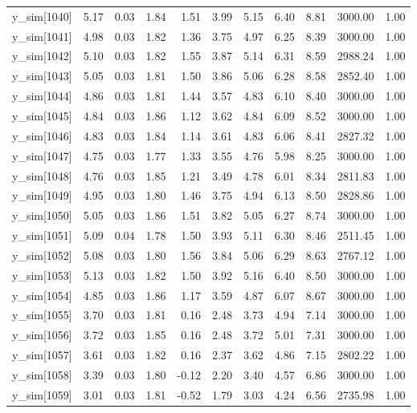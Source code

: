 \begin{table}[ht]
\begin{tabular}{rrrrrrrrrrr}
  y\_sim[1040] & 5.17 & 0.03 & 1.84 & 1.51 & 3.99 & 5.15 & 6.40 & 8.81 & 3000.00 & 1.00 \\ 
  y\_sim[1041] & 4.98 & 0.03 & 1.82 & 1.36 & 3.75 & 4.97 & 6.25 & 8.39 & 3000.00 & 1.00 \\ 
  y\_sim[1042] & 5.10 & 0.03 & 1.82 & 1.55 & 3.87 & 5.14 & 6.31 & 8.59 & 2988.24 & 1.00 \\ 
  y\_sim[1043] & 5.05 & 0.03 & 1.81 & 1.50 & 3.86 & 5.06 & 6.28 & 8.58 & 2852.40 & 1.00 \\ 
  y\_sim[1044] & 4.86 & 0.03 & 1.81 & 1.44 & 3.57 & 4.83 & 6.10 & 8.40 & 3000.00 & 1.00 \\ 
  y\_sim[1045] & 4.84 & 0.03 & 1.86 & 1.12 & 3.62 & 4.84 & 6.09 & 8.52 & 3000.00 & 1.00 \\ 
  y\_sim[1046] & 4.83 & 0.03 & 1.84 & 1.14 & 3.61 & 4.83 & 6.06 & 8.41 & 2827.32 & 1.00 \\ 
  y\_sim[1047] & 4.75 & 0.03 & 1.77 & 1.33 & 3.55 & 4.76 & 5.98 & 8.25 & 3000.00 & 1.00 \\ 
  y\_sim[1048] & 4.76 & 0.03 & 1.85 & 1.21 & 3.49 & 4.78 & 6.01 & 8.34 & 2811.83 & 1.00 \\ 
  y\_sim[1049] & 4.95 & 0.03 & 1.80 & 1.46 & 3.75 & 4.94 & 6.13 & 8.50 & 2828.86 & 1.00 \\ 
  y\_sim[1050] & 5.05 & 0.03 & 1.86 & 1.51 & 3.82 & 5.05 & 6.27 & 8.74 & 3000.00 & 1.00 \\ 
  y\_sim[1051] & 5.09 & 0.04 & 1.78 & 1.50 & 3.93 & 5.11 & 6.30 & 8.46 & 2511.45 & 1.00 \\ 
  y\_sim[1052] & 5.08 & 0.03 & 1.80 & 1.56 & 3.84 & 5.06 & 6.29 & 8.63 & 2767.12 & 1.00 \\ 
  y\_sim[1053] & 5.13 & 0.03 & 1.82 & 1.50 & 3.92 & 5.16 & 6.40 & 8.50 & 3000.00 & 1.00 \\ 
  y\_sim[1054] & 4.85 & 0.03 & 1.86 & 1.17 & 3.59 & 4.87 & 6.07 & 8.67 & 3000.00 & 1.00 \\ 
  y\_sim[1055] & 3.70 & 0.03 & 1.81 & 0.16 & 2.48 & 3.73 & 4.94 & 7.14 & 3000.00 & 1.00 \\ 
  y\_sim[1056] & 3.72 & 0.03 & 1.85 & 0.16 & 2.48 & 3.72 & 5.01 & 7.31 & 3000.00 & 1.00 \\ 
  y\_sim[1057] & 3.61 & 0.03 & 1.82 & 0.16 & 2.37 & 3.62 & 4.86 & 7.15 & 2802.22 & 1.00 \\ 
  y\_sim[1058] & 3.39 & 0.03 & 1.80 & -0.12 & 2.20 & 3.40 & 4.57 & 6.86 & 3000.00 & 1.00 \\ 
  y\_sim[1059] & 3.01 & 0.03 & 1.81 & -0.52 & 1.79 & 3.03 & 4.24 & 6.56 & 2735.98 & 1.00 \\ 

\end{tabular}
\end{table}
